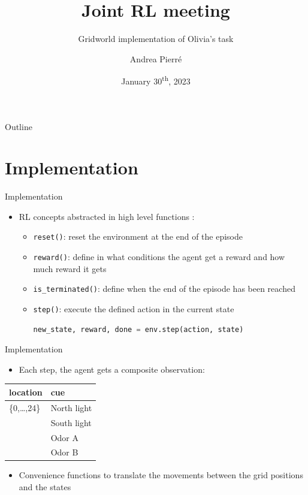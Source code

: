 \documentclass[bigger]{beamer}
\author{Andrea Pierré}
\date{January 30\textsuperscript{th}, 2023}
\title{Joint RL meeting}
\subtitle{Gridworld implementation of Olivia's task}
\institute{Brown University}
\begin{document}
\maketitle
\begin{frame}{Outline}
\tableofcontents
\end{frame}

\section{Implementation}
\label{sec:org3de9fda}
\begin{frame}[<+->][label={sec:org4471204},fragile]{Implementation}
 \begin{itemize}
\item RL concepts abstracted in high level functions :
\begin{itemize}
\item \texttt{reset()}: reset the environment at the end of the episode
\item \texttt{reward()}: define in what conditions the agent get a reward and how much reward it gets
\item \texttt{is\_terminated()}: define when the end of the episode has been reached
\item \texttt{step()}: execute the defined action in the current state
\scriptsize
\begin{lstlisting}[language={Python}]
new_state, reward, done = env.step(action, state)
\end{lstlisting}
\end{itemize}
\end{itemize}
\end{frame}
\begin{frame}[<+->][label={sec:orgadb2eac}]{Implementation}
\begin{itemize}
\item Each step, the agent gets a composite observation:
\end{itemize}
\begin{center}
\begin{tabular}{ll}
\hline
location & cue\\
\hline
\{0,\ldots{},24\} & North light\\
 & South light\\
 & Odor A\\
 & Odor B\\
\hline
\end{tabular}
\end{center}
\begin{itemize}
\item Convenience functions to translate the movements between the grid positions and the states
\end{itemize}
\end{frame}
\end{document}
